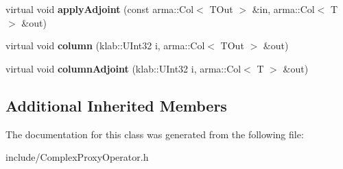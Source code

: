 \begin{DoxyCompactItemize}
\item 
virtual void {\bfseries apply\+Adjoint} (const arma\+::\+Col$<$ T\+Out $>$ \&in, arma\+::\+Col$<$ T $>$ \&out)\hypertarget{classkl1p_1_1TComplexProxyOperator_a676edd30945e40b8d7a4e11c54080d73}{}\label{classkl1p_1_1TComplexProxyOperator_a676edd30945e40b8d7a4e11c54080d73}

\item 
virtual void {\bfseries column} (klab\+::\+U\+Int32 i, arma\+::\+Col$<$ T\+Out $>$ \&out)\hypertarget{classkl1p_1_1TComplexProxyOperator_a6da69fc2c467496b2a567682ca1bbe0c}{}\label{classkl1p_1_1TComplexProxyOperator_a6da69fc2c467496b2a567682ca1bbe0c}

\item 
virtual void {\bfseries column\+Adjoint} (klab\+::\+U\+Int32 i, arma\+::\+Col$<$ T $>$ \&out)\hypertarget{classkl1p_1_1TComplexProxyOperator_a30c8377005770632f51ff8f45569c030}{}\label{classkl1p_1_1TComplexProxyOperator_a30c8377005770632f51ff8f45569c030}

\end{DoxyCompactItemize}
\subsection*{Additional Inherited Members}


The documentation for this class was generated from the following file\+:\begin{DoxyCompactItemize}
\item 
include/Complex\+Proxy\+Operator.\+h\end{DoxyCompactItemize}
